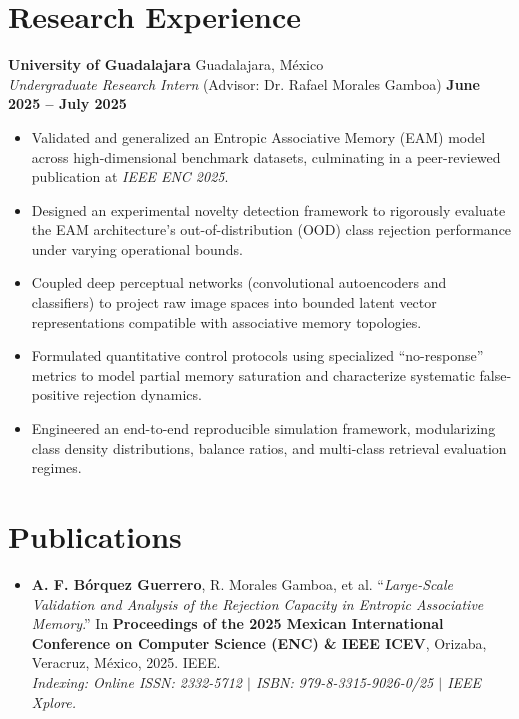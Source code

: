 \documentclass[11pt]{article}
\begin{document}
\section*{Research Experience}
\textbf{University of Guadalajara} \hfill Guadalajara, México \\
\textit{Undergraduate Research Intern} (Advisor: Dr. Rafael Morales Gamboa) \hfill \textbf{June 2025 -- July 2025}
\vspace{-0.3cm}
\begin{itemize}
    \item Validated and generalized an Entropic Associative Memory (EAM) model across high-dimensional benchmark datasets, culminating in a peer-reviewed publication at \textit{IEEE ENC 2025}.

    \vspace{-0.3cm}
    \item Designed an experimental novelty detection framework to rigorously evaluate the EAM architecture's out-of-distribution (OOD) class rejection performance under varying operational bounds.

    \vspace{-0.3cm}
    \item Coupled deep perceptual networks (convolutional autoencoders and classifiers) to project raw image spaces into bounded latent vector representations compatible with associative memory topologies.

    \vspace{-0.3cm}
    \item Formulated quantitative control protocols using specialized ``no-response'' metrics to model partial memory saturation and characterize systematic false-positive rejection dynamics.

    \vspace{-0.3cm}
    \item Engineered an end-to-end reproducible simulation framework, modularizing class density distributions, balance ratios, and multi-class retrieval evaluation regimes.
\end{itemize}


\section*{Publications}
\begin{itemize}
    \item \textbf{A. F. Bórquez Guerrero}, R. Morales Gamboa, et al. ``\textit{Large-Scale Validation and Analysis of the Rejection Capacity in Entropic Associative Memory}.'' In \textbf{Proceedings of the 2025 Mexican International Conference on Computer Science (ENC) \& IEEE ICEV}, Orizaba, Veracruz, México, 2025. IEEE. \\
    \footnotesize\textit{Indexing: Online ISSN: 2332-5712 $\vert$ ISBN: 979-8-3315-9026-0/25 $\vert$ IEEE Xplore.}
\end{itemize}
\end{document}
